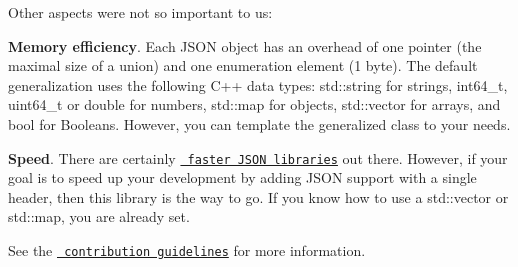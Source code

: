 Other aspects were not so important to us\+:


\begin{DoxyItemize}
\item {\bfseries{Memory efficiency}}. Each JSON object has an overhead of one pointer (the maximal size of a union) and one enumeration element (1 byte). The default generalization uses the following C++ data types\+: {\ttfamily std\+::string} for strings, {\ttfamily int64\+\_\+t}, {\ttfamily uint64\+\_\+t} or {\ttfamily double} for numbers, {\ttfamily std\+::map} for objects, {\ttfamily std\+::vector} for arrays, and {\ttfamily bool} for Booleans. However, you can template the generalized class {\ttfamily {}} to your needs.
\item {\bfseries{Speed}}. There are certainly \href{https://github.com/miloyip/nativejson-benchmark\#parsing-time}{\texttt{ faster JSON libraries}} out there. However, if your goal is to speed up your development by adding JSON support with a single header, then this library is the way to go. If you know how to use a {\ttfamily std\+::vector} or {\ttfamily std\+::map}, you are already set.
\end{DoxyItemize}

See the \href{https://github.com/nlohmann/json/blob/master/.github/CONTRIBUTING.md\#please-dont}{\texttt{ contribution guidelines}} for more information. 